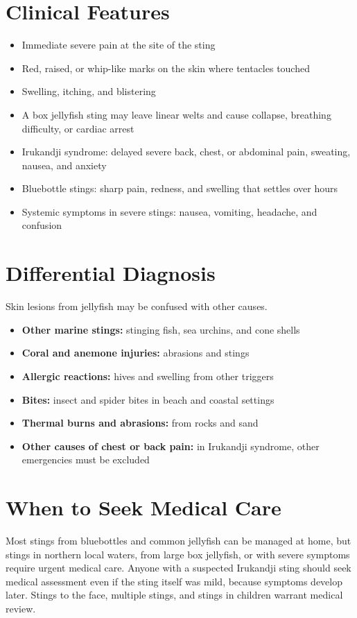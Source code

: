 \section*{Clinical Features}
\begin{itemize}
    \item Immediate severe pain at the site of the sting
    \item Red, raised, or whip-like marks on the skin where tentacles touched
    \item Swelling, itching, and blistering
    \item A box jellyfish sting may leave linear welts and cause collapse, breathing difficulty, or cardiac arrest
    \item Irukandji syndrome: delayed severe back, chest, or abdominal pain, sweating, nausea, and anxiety
    \item Bluebottle stings: sharp pain, redness, and swelling that settles over hours
    \item Systemic symptoms in severe stings: nausea, vomiting, headache, and confusion
\end{itemize}

\section*{Differential Diagnosis}
Skin lesions from jellyfish may be confused with other causes.
\begin{itemize}
    \item \textbf{Other marine stings:} stinging fish, sea urchins, and cone shells
    \item \textbf{Coral and anemone injuries:} abrasions and stings
    \item \textbf{Allergic reactions:} hives and swelling from other triggers
    \item \textbf{Bites:} insect and spider bites in beach and coastal settings
    \item \textbf{Thermal burns and abrasions:} from rocks and sand
    \item \textbf{Other causes of chest or back pain:} in Irukandji syndrome, other emergencies must be excluded
\end{itemize}

\section*{When to Seek Medical Care}
Most stings from bluebottles and common jellyfish can be managed at home, but stings in northern local waters, from large box jellyfish, or with severe symptoms require urgent medical care. Anyone with a suspected Irukandji sting should seek medical assessment even if the sting itself was mild, because symptoms develop later. Stings to the face, multiple stings, and stings in children warrant medical review.

